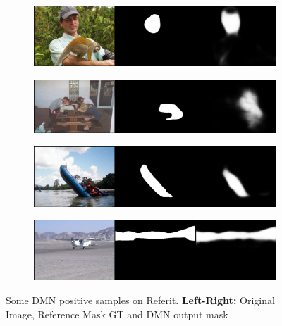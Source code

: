 \begin{figure}[!htbp]
\ContinuedFloat
    \centering
    \begin{subfigure}[b]{\columnwidth}
            \centering
            \includegraphics[width=\textwidth]{./figures/referit_samples/1.png}
    \end{subfigure}
    
    \begin{subfigure}[b]{\columnwidth}
            \centering
            \includegraphics[width=\textwidth]{./figures/referit_samples/4.png}
    \end{subfigure}
    
    \begin{subfigure}[b]{\columnwidth}
            \centering
            \includegraphics[width=\textwidth]{./figures/referit_samples/3.png}
    \end{subfigure}
    
    \begin{subfigure}[b]{\columnwidth}
            \centering
            \includegraphics[width=\textwidth]{./figures/referit_samples/5.png}
    \end{subfigure}
    \caption{Some DMN positive samples on Referit. \textbf{Left-Right:} Original Image, Reference Mask GT and DMN output mask}
    \label{Fig:Referit_Pos}
\end{figure}


